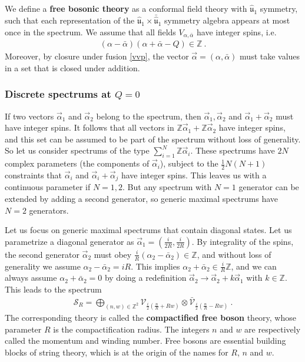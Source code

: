 \documentclass[12pt, a4paper, notitlepage, twoside]{report}
\numberwithin{equation}{section}
\theoremstyle{break}
\begin{document}
We define a \textbf{\boldmath free bosonic theory} as a conformal field theory with $\hat{\mathfrak{u}}_1$ symmetry, such that each representation of the $\hat{\mathfrak{u}}_1 \times \bar{\hat{\mathfrak{u}}}_1$ symmetry algebra appears at most once in the spectrum. We assume that all fields $V_{\alpha,\bar\alpha}$ have integer spins, i.e. 
\begin{align}
 (\alpha-\bar\alpha)(\alpha+\bar\alpha-Q)\in\mathbb{Z}\ . 
\end{align}
Moreover, by closure under fusion \eqref{vvp}, the vector $\vec\alpha = (\alpha,\bar\alpha)$ must take values in a set that is closed under addition.

\subsubsection{Discrete spectrums at $Q=0$}

If two vectors $\vec\alpha_1$ and $\vec\alpha_2$ belong to the spectrum, then $\vec\alpha_1,\vec\alpha_2$ and $\vec\alpha_1+\vec\alpha_2$ must have integer spins.
It follows that all vectors in $\mathbb{Z}\vec\alpha_1 + \mathbb{Z}\vec\alpha_2$ have integer spins, and this set can be assumed to be part of the spectrum without loss of generality. 
So let us consider spectrums of the type $\sum_{i=1}^N \mathbb{Z}\vec \alpha_i$. 
These spectrums have $2N$ complex parameters (the components of $\vec\alpha_i$), subject to the $\frac12 N(N+1)$ constraints that $\vec\alpha_i$ and $\vec\alpha_i+\vec\alpha_j$ have integer spins. 
This leaves us with a continuous parameter if $N=1,2$. But any spectrum with $N=1$ generator can be extended by adding a second generator, so generic maximal spectrums have $N=2$ generators.

Let us focus on generic maximal spectrums that contain diagonal states. 
Let us parametrize a diagonal generator as  $\vec\alpha_1=(\frac{i}{2R},\frac{i}{2R})$. By integrality of the spins, the second generator $\vec\alpha_2$ must obey $\frac{i}{R}(\alpha_2-\bar\alpha_2)\in\mathbb{Z}$, and without loss of generality we assume $\alpha_2-\bar\alpha_2=iR$. This implies $\alpha_2+\bar\alpha_2 \in \frac{i}{R}\mathbb{Z}$, and we can always assume $\alpha_2+\bar\alpha_2=0$ by doing a redefinition $\vec\alpha_2\to \vec\alpha_2+k\vec\alpha_1$ with $k\in\mathbb{Z}$. This leads to the spectrum
\begin{align}
 \boxed{\mathcal{S}_R = \bigoplus_{(n,w)\in {\mathbb{Z}^2}} \mathcal{V}_{\frac{i}{2}\left(\frac{n}{R} + Rw\right)} \otimes \bar{\mathcal{V}}_{\frac{i}{2}\left(\frac{n}{R} - Rw\right)} }\ .
\label{sr}
\end{align}
The corresponding theory is called the \textbf{\boldmath compactified free boson} theory, whose parameter $R$ is  the compactification radius.
The integers $n$ and $w$ are respectively called the momentum and winding number.
Free bosons are essential building blocks of string theory, which is at the origin of the names for $R$, $n$ and $w$.
\end{document}
